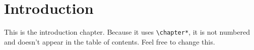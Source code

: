 \chapter*{Introduction}
This is the introduction chapter.  Because it uses \lstinline{\chapter*}, it is not numbered and doesn't appear in the table of contents.  Feel free to change this.

